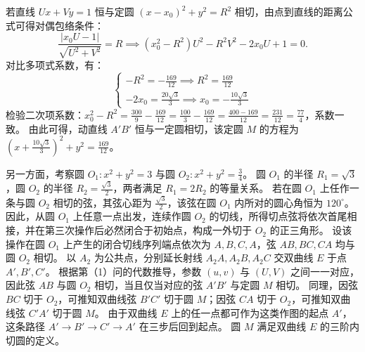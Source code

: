 \begin{solution}
若直线 $Ux + Vy = 1$ 恒与定圆 $(x - x_0)^2 + y^2 = R^2$ 相切，由点到直线的距离公式可得对偶包络条件：
\[ \frac{|x_0 U - 1|}{\sqrt{U^2 + V^2}} = R \implies (x_0^2 - R^2)U^2 - R^2 V^2 - 2x_0 U + 1 = 0. \]
对比多项式系数，有：
\[ \begin{cases} -R^2 = -\frac{169}{12} \implies R^2 = \frac{169}{12} \\ -2x_0 = \frac{20\sqrt{3}}{3} \implies x_0 = -\frac{10\sqrt{3}}{3} \end{cases} \]
检验二次项系数：$x_0^2 - R^2 = \frac{300}{9} - \frac{169}{12} = \frac{100}{3} - \frac{169}{12} = \frac{400-169}{12} = \frac{231}{12} = \frac{77}{4}$，系数一致。
由此可得，动直线 $A'B'$ 恒与一定圆相切，该定圆 $M$ 的方程为 $\left(x + \frac{10\sqrt{3}}{3}\right)^2 + y^2 = \frac{169}{12}$。

另一方面，考察圆 $O_1: x^2 + y^2 = 3$ 与圆 $O_2: x^2 + y^2 = \frac{3}{4}$。
圆 $O_1$ 的半径 $R_1 = \sqrt{3}$，圆 $O_2$ 的半径 $R_2 = \frac{\sqrt{3}}{2}$，两者满足 $R_1 = 2R_2$ 的等量关系。
若在圆 $O_1$ 上任作一条与圆 $O_2$ 相切的弦，其弦心距为 $\frac{\sqrt{3}}{2}$，该弦在圆 $O_1$ 内所对的圆心角恒为 $120^\circ$。
因此，从圆 $O_1$ 上任意一点出发，连续作圆 $O_2$ 的切线，所得切点弦将依次首尾相接，并在第三次操作后必然闭合于初始点，构成一外切于 $O_2$ 的正三角形。
设该操作在圆 $O_1$ 上产生的闭合切线序列端点依次为 $A, B, C, A$，弦 $AB, BC, CA$ 均与圆 $O_2$ 相切。
以 $A_2$ 为公共点，分别延长射线 $A_2A, A_2B, A_2C$ 交双曲线 $E$ 于点 $A', B', C'$。
根据第（1）问的代数推导，参数 $(u, v)$ 与 $(U, V)$ 之间一一对应，因此弦 $AB$ 与圆 $O_2$ 相切，当且仅当对应的弦 $A'B'$ 与定圆 $M$ 相切。
同理，因弦 $BC$ 切于 $O_2$，可推知双曲线弦 $B'C'$ 切于圆 $M$；因弦 $CA$ 切于 $O_2$，可推知双曲线弦 $C'A'$ 切于圆 $M$。
由于双曲线 $E$ 上的任一点都可作为这类作图的起点 $A'$，这条路径 $A' \to B' \to C' \to A'$ 在三步后回到起点。
圆 $M$ 满足双曲线 $E$ 的三阶内切圆的定义。
\end{solution}

